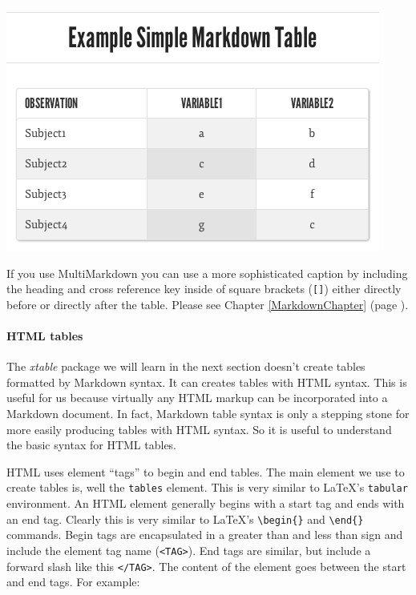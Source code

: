 \includegraphics[scale = 0.6]{Children/Chapter9/images9/MarkedCaptionTableExample.png}

\noindent If you use MultiMarkdown you can use a more sophisticated caption by including the heading and cross reference key inside of square brackets (\verb|[]|) either directly before or directly after the table. Please see Chapter \ref{MarkdownChapter} (page \pageref{MultiMarkdownDiscussion}).

\paragraph{HTML tables}

The \emph{xtable} package we will learn in the next section doesn't create tables formatted by Markdown syntax. It can creates tables with HTML syntax. This is useful for us because virtually any HTML markup can be incorporated into a Markdown document. In fact, Markdown table syntax is only a stepping stone for more easily producing tables with HTML syntax. So it is useful to understand the basic syntax for HTML tables.

HTML uses element ``tags'' to begin and end tables. The main element we use to create tables is, well the \texttt{tables} element. This is very similar to LaTeX's \texttt{tabular} environment. An HTML element generally begins with a start tag and ends with an end tag. Clearly this is very similar to LaTeX's \verb|\begin{}| and \verb|\end{}| commands. Begin tags are encapsulated in a greater than and less than sign and include the element tag name (\verb|<TAG>|). End tags are similar, but include a forward slash like this \verb|</TAG>|. The content of the element goes between the start and end tags. For example:

